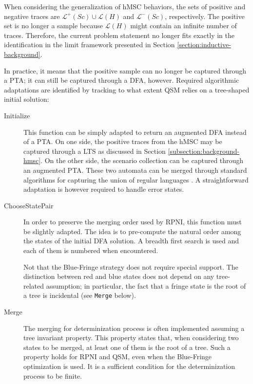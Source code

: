 When considering the generalization of hMSC behaviors, the sets of positive and negative traces are $\mathcal{L}^+(Sc) \cup \mathcal{L}(H)$ and $\mathcal{L}^-(Sc)$, respectively. The positive set is no longer a sample because $\mathcal{L}(H)$ might contain an infinite number of traces. Therefore, the current problem statement no longer fits exactly in the identification in the limit framework presented in Section \ref{section:inductive-background}.

In practice, it means that the positive sample can no longer be captured through a PTA; it can still be captured through a DFA, however. Required algorithmic adaptations are identified by tracking to what extent QSM relies on a tree-shaped initial solution:

\begin{description}

\item[Initialize] This function can be simply adapted to return an augmented DFA instead of a PTA. On one side, the positive traces from the hMSC may be captured through a LTS as discussed in Section \ref{subsection:background-hmsc}. On the other side, the scenario collection can be captured through an augmented PTA. These two automata can be merged through standard algorithms for capturing the union of regular languages \cite{Hopcroft:1979}. A straightforward adaptation is however required to handle error states. 

\item[ChooseStatePair] In order to preserve the merging order used by RPNI, this function must be slightly adapted. The idea is to pre-compute the natural order among the states of the initial DFA solution. A breadth first search is used and each of them is numbered when encountered. 

Not that the Blue-Fringe strategy does not require special support. The distinction between red and blue states does not depend on any tree-related assumption; in particular, the fact that a fringe state is the root of a tree is incidental (see \texttt{Merge} below).

\item[Merge] The merging for determinization process is often implemented assuming a tree invariant property. This property states that, when considering two states to be merged, at least one of them is the root of a tree. Such a property holds for RPNI and QSM, even when the Blue-Fringe optimization is used. It is a sufficient condition for the determinization process to be finite. 


\end{description}
